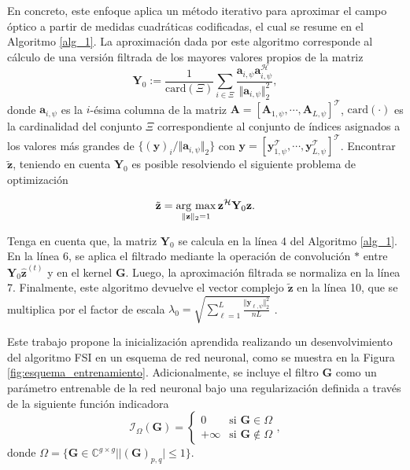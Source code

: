 En concreto, este enfoque aplica un método iterativo para aproximar el campo óptico a partir de medidas cuadráticas codificadas, el cual se resume en el Algoritmo \ref{alg_1}. La aproximación dada por este algoritmo corresponde al cálculo de una versión filtrada de los mayores valores propios de la matriz
\begin{equation}
\mathbf{Y}_{0}:=\frac{1}{\mathrm{card}(\Xi)}\sum_{i\in\Xi}\frac{\mathbf{a}_{i,\psi}\mathbf{a}_{i,\psi}^\mathcal{H}}{\Vert\mathbf{a}_{i,\psi}\Vert_2^2},\label{eq:YO}
\end{equation}
donde $\mathbf{a}_{i,\psi}$ es la $i$-ésima columna de la matriz $\mathbf{A}=[\mathbf{A}_{1,\psi},\cdots,\mathbf{A}_{L,\psi}]^\mathcal{T}$, $\mathrm{card}(\cdot)$ es la cardinalidad del conjunto $\Xi$ correspondiente al conjunto de índices asignados a los valores más grandes de $\{(\mathbf{y})_i / \Vert \mathbf{a}_{i,\psi}\Vert_{2}\}$ con $\mathbf{y}=[\mathbf{y}_{1,\psi}^\mathcal{T},\cdots,\mathbf{y}_{L,\psi}^\mathcal{T}]^\mathcal{T}$.  Encontrar $\tilde{\mathbf{z}}$, teniendo en cuenta $\mathbf{Y}_0$ es posible resolviendo el siguiente problema de optimización


\begin{equation}
    \tilde{\mathbf{z}}=\operatorname*{arg \ max}_{\Vert{\mathbf{z}}\Vert_2=1}{\mathbf{z}}^\mathcal{H}\mathbf{Y}_{0}{\mathbf{z}}.
\end{equation}


Tenga en cuenta que, la matriz $\mathbf{Y}_{0}$ se calcula en la línea 4 del Algoritmo \ref{alg_1}. En la línea 6, se aplica el filtrado mediante la operación de convolución $*$ entre $\mathbf{Y}_{0}\hat{\mathbf{z}}^{(t)}$ y en el kernel $\mathbf{G}$. Luego, la aproximación filtrada se normaliza en la línea 7. Finalmente, este algoritmo devuelve el vector complejo $\tilde{\mathbf{z}}$ en la línea 10, que se multiplica por el factor de escala $\lambda_0=\sqrt{\sum_{\ell=1}^{L}\frac{\Vert\mathbf{y}_{\ell,\psi}\Vert_{2}^2}{nL}}$ . %
  

Este trabajo propone la inicialización aprendida realizando un desenvolvimiento del algoritmo FSI en un esquema de red neuronal, como se muestra en la Figura \ref{fig:esquema_entrenamiento}. Adicionalmente, se incluye el filtro $\mathbf{G}$ como un parámetro entrenable de la red neuronal bajo una regularización definida a través de la siguiente función indicadora
\begin{equation}
  \mathcal{I}_{\Omega}(\mathbf{G})=  \left\{\begin{matrix}
 0& \text{si } \mathbf{G}\in \Omega \\ 
+\infty & \text{si } \mathbf{G}\notin \Omega 
\end{matrix}\right., \label{eq:regularizationG}
\end{equation}
donde $\Omega=\{\mathbf{G}\in\mathbb{C}^{g\times g}| |(\mathbf{G})_{p,q}|\leq 1\}$. 


